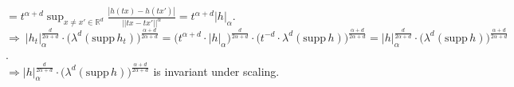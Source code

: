 \documentclass{article}
\begin{document}
\hspace*{4.8cm}$= t^{\alpha + d} \sup_{x \neq x' \in \mathbb{R}^d} \frac{ |h(tx)-h(tx')|}{ || tx-tx' || ^{\alpha}} = t^{\alpha + d} |h|_{\alpha} $. \vspace*{0.5em} \\
$\Rightarrow \ |h_t|_{\alpha}^{ \frac{d}{2\alpha + d} } \cdot \big( \lambda ^d (\text{supp}\,h_t)  \big)^{ \frac{\alpha + d}{2 \alpha + d} } = \big(t^{\alpha + d} \cdot |h|_{\alpha} \big) ^{ \frac{d}{2\alpha + d} } \cdot \big( t^{-d} \cdot  \lambda ^d (\text{supp}\,h)  \big)^{ \frac{\alpha + d}{2 \alpha + d} } = |h|_{\alpha}^{ \frac{d}{2\alpha + d} } \cdot \big( \lambda ^d (\text{supp}\,h)  \big)^{ \frac{\alpha + d}{2 \alpha + d} }  $.\vspace*{1em}  \\
$\Rightarrow |h|_{\alpha}^{ \frac{d}{2\alpha + d} } \cdot \big( \lambda ^d (\text{supp}\,h)  \big)^{ \frac{\alpha + d}{2 \alpha + d} } $ is invariant under scaling. 
\end{document}

